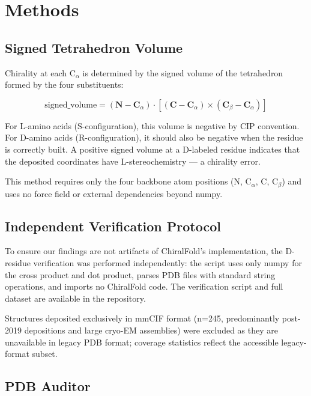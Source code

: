 \documentclass[11pt]{article}
\begin{document}
\section{Methods}

\subsection{Signed Tetrahedron Volume}

Chirality at each C$_\alpha$ is determined by the signed volume of the tetrahedron formed by the four substituents:

\begin{equation}
\text{signed\_volume} = (\mathbf{N} - \mathbf{C}_\alpha) \cdot \left[ (\mathbf{C} - \mathbf{C}_\alpha) \times (\mathbf{C}_\beta - \mathbf{C}_\alpha) \right]
\end{equation}

For L-amino acids (S-configuration), this volume is negative by CIP convention. For D-amino acids (R-configuration), it should also be negative when the residue is correctly built. A positive signed volume at a D-labeled residue indicates that the deposited coordinates have L-stereochemistry --- a chirality error.

This method requires only the four backbone atom positions (N, C$_\alpha$, C, C$_\beta$) and uses no force field or external dependencies beyond numpy.

\subsection{Independent Verification Protocol}

To ensure our findings are not artifacts of ChiralFold's implementation, the D-residue verification was performed independently: the script uses only numpy for the cross product and dot product, parses PDB files with standard string operations, and imports no ChiralFold code. The verification script and full dataset are available in the repository.

Structures deposited exclusively in mmCIF format (n=245, predominantly post-2019 depositions and large cryo-EM assemblies) were excluded as they are unavailable in legacy PDB format; coverage statistics reflect the accessible legacy-format subset.

\subsection{PDB Auditor}
\end{document}
